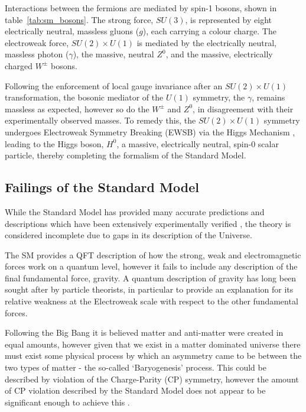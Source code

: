 Interactions between the fermions are mediated by spin-1 bosons, shown in
table~\ref{tab:sm_bosons}. The strong 
force, $SU(3)$, is represented by eight electrically neutral, massless gluons 
($g$), each carrying a colour charge. The electroweak force, $SU(2)\times U(1)$
is
mediated by the electrically neutral, massless photon ($\gamma$), the massive,
neutral $Z^0$, and the massive, electrically charged $W^{\pm}$ bosons.

Following the enforcement of local gauge invariance after an
$SU(2)\times U (1)$ transformation,
the bosonic mediator of the $U(1)$ symmetry, the $\gamma$, remains massless as
expected, however so do the $W^{\pm}$ and $Z^0$, in disagreement with their
experimentally observed masses. To remedy this, the $SU(2)\times U(1)$ symmetry
undergoes Electroweak Symmetry Breaking (EWSB) via the Higgs Mechanism
\cite{PhysRevLett.13.321,PhysRevLett.13.508,PhysRevLett.13.585}, 
leading to the Higgs boson, $H^0$, a massive, electrically neutral, spin-0
scalar particle, thereby completing the formalism of the Standard Model.



\subsection{Failings of the Standard Model}

While the Standard Model has provided many accurate predictions and descriptions
which have been extensively experimentally verified \cite{Baak:2014ora}, the
theory is considered incomplete due to gaps in its description of the Universe.

The SM provides a QFT description of how the strong, weak and electromagnetic
forces work on a quantum level, however it fails to include any description of
the final fundamental force, gravity. A quantum description of gravity has long
been sought after by particle theorists, in particular to provide an explanation
for its relative weakness at the Electroweak scale with respect to the other
fundamental forces.

Following the Big Bang it is believed matter and anti-matter were created in
equal amounts, however given that we exist in a matter dominated universe there
must exist some physical process by which an asymmetry came to be between the
two types of matter - the so-called `Baryogenesis' process. This could
be described by violation of the Charge-Parity (CP) symmetry,
however the amount of CP violation described by the Standard Model
does not appear to be significant enough to achieve this
\cite{Riotto:1999yt, Hou:2008xd}.

